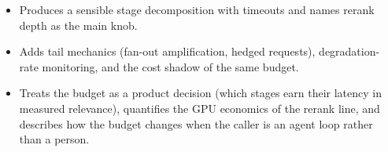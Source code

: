 \begin{interviewq}

\goodgreat
\begin{itemize}
    \item {} Produces a sensible stage decomposition with timeouts and names rerank depth as the main knob.
    \item {} Adds tail mechanics (fan-out amplification, hedged requests), degradation-rate monitoring, and the cost shadow of the same budget.
    \item {} Treats the budget as a product decision (which stages earn their latency in measured relevance), quantifies the GPU economics of the rerank line, and describes how the budget changes when the caller is an agent loop rather than a person.
\end{itemize}

\end{interviewq}

